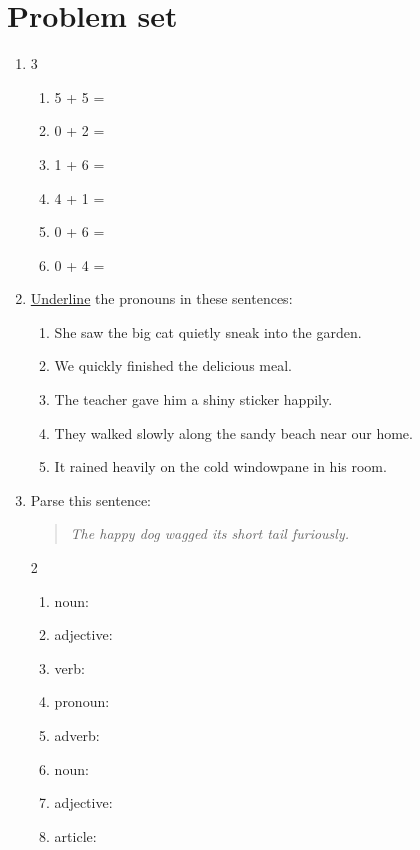 \documentclass{tufte-book}
\begin{document}
\clearpage\section{Problem set }

\begin{enumerate}
  \item
  \begin{multicols}{3}
    \begin{enumerate}\bigskip
      \item 5 + 5 = \dotfill\bigskip
      \item 0 + 2 = \dotfill
      \item 1 + 6 = \dotfill\bigskip
      \item 4 + 1 = \dotfill
      \item 0 + 6 = \dotfill\bigskip
      \item 0 + 4 = \dotfill
    \end{enumerate}
  \end{multicols}

  \item \underline{Underline} the pronouns in these sentences:
  \begin{enumerate}
    \item She saw the big cat quietly sneak into the garden.
    \item We quickly finished the delicious meal.
    \item The teacher gave him a shiny sticker happily.
    \item They walked slowly along the sandy beach near our home.
    \item It rained heavily on the cold windowpane in his room.
    \end{enumerate}

  \item Parse this sentence:
  \begin{quote}
    \textit{The happy dog wagged its short tail furiously.}
  \end{quote}
  \begin{multicols}{2}
  \begin{enumerate}\bigskip
    \item noun: \dotfill\bigskip
    \item adjective: \dotfill\bigskip
    \item verb: \dotfill\bigskip
    \item pronoun: \dotfill
    \item adverb: \dotfill\bigskip
    \item noun: \dotfill\bigskip
    \item adjective: \dotfill\bigskip
    \item article: \dotfill
  \end{enumerate}
  \end{multicols}


\end{enumerate}
\end{document}
